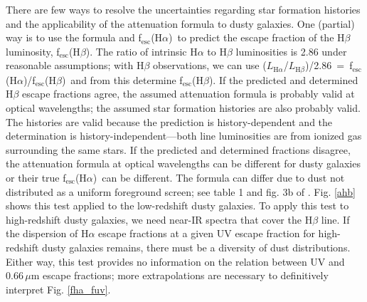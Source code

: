 \documentclass[referee]{aa}
\newcommand{\alephha}{f$_{\mathrm{esc}}$(H$\alpha$)}
\newcommand{\alephhb}{f$_{\mathrm{esc}}$(H$\beta$)}
\begin{document}
There are few ways to resolve the uncertainties regarding star formation
histories and the applicability of the \citet{calzetti00} attenuation formula
to dusty galaxies.  One (partial) way is to use the formula and
\alephha~to predict the escape fraction of the H$\beta$ luminosity,
\alephhb.  The ratio of intrinsic
H$\alpha$ to H$\beta$ luminosities is 2.86 under reasonable
assumptions; with H$\beta$ observations, we can use
($L_{\mathrm{H}\alpha}$/$L_{\mathrm{H}\beta}$)/2.86~=~\alephha/\alephhb~and from this
determine \alephhb.  If the predicted and determined H$\beta$ escape fractions
agree, the assumed attenuation formula is probably valid at optical
wavelengths; the assumed star formation histories are also probably valid.
The histories are valid because the prediction is history-dependent and the
determination is history-independent---both line luminosities are from ionized
gas surrounding the same stars.  If
the predicted and determined fractions disagree, the attenuation
formula at optical wavelengths can be different for dusty galaxies
or their true \alephha~can be different.  The formula can differ due to dust
not distributed as a uniform foreground screen; see table 1 and fig. 3b of
\citealt{calzetti01}.  Fig. \ref{ahb}
shows this test applied to the low-redshift dusty galaxies.  To apply this
test to high-redshift dusty galaxies, we need near-IR spectra that cover
the H$\beta$ line.  If the dispersion
of H$\alpha$ escape fractions at a given UV escape fraction for high-redshift
dusty galaxies remains, there must be a diversity of dust
distributions.  Either way, this test provides no information on the relation
between UV and 0.66$\,\mu$m escape fractions; more extrapolations are
necessary to definitively interpret Fig. \ref{fha_fuv}.
\end{document}
